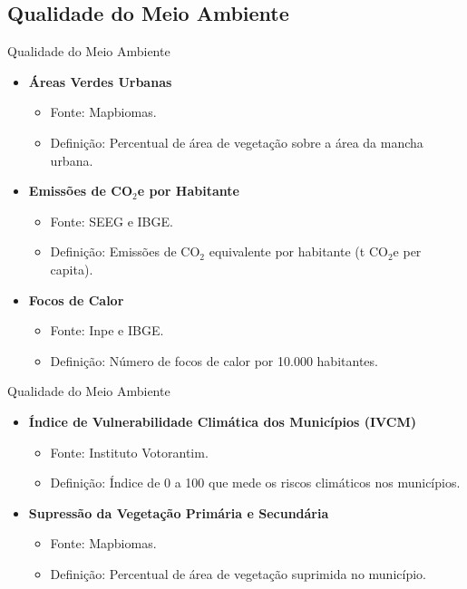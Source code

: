 \documentclass{beamer}
\begin{document}
\subsection{Qualidade do Meio Ambiente}
\begin{frame}{Qualidade do Meio Ambiente}
\begin{itemize}
    \item \textbf{Áreas Verdes Urbanas}
    \begin{itemize}
        \item Fonte: Mapbiomas.
        \item Definição: Percentual de área de vegetação sobre a área da mancha urbana.
    \end{itemize}
    \item \textbf{Emissões de CO$_2$e por Habitante}
    \begin{itemize}
        \item Fonte: SEEG e IBGE.
        \item Definição: Emissões de CO$_2$ equivalente por habitante (t CO$_2$e per capita).
    \end{itemize}
    \item \textbf{Focos de Calor}
    \begin{itemize}
        \item Fonte: Inpe e IBGE.
        \item Definição: Número de focos de calor por 10.000 habitantes.
    \end{itemize}
\end{itemize}
\end{frame}


\begin{frame}{Qualidade do Meio Ambiente}
\begin{itemize}
    \item \textbf{Índice de Vulnerabilidade Climática dos Municípios (IVCM)}
    \begin{itemize}
        \item Fonte: Instituto Votorantim.
        \item Definição: Índice de 0 a 100 que mede os riscos climáticos nos municípios.
    \end{itemize}
    \item \textbf{Supressão da Vegetação Primária e Secundária}
    \begin{itemize}
        \item Fonte: Mapbiomas.
        \item Definição: Percentual de área de vegetação suprimida no município.
    \end{itemize}
\end{itemize}
\end{frame}
\end{document}
